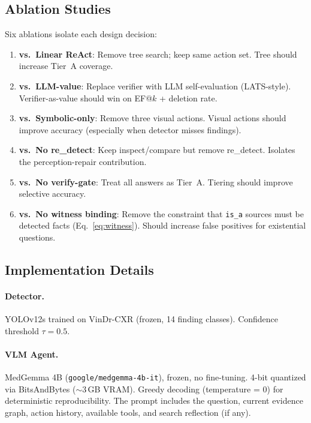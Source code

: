 \documentclass[runningheads]{llncs}
\begin{document}
\subsection{Ablation Studies}

Six ablations isolate each design decision:
\begin{enumerate}
  \item \textbf{vs.\ Linear ReAct}: Remove tree search; keep same action
    set. Tree should increase Tier~A coverage.
  \item \textbf{vs.\ LLM-value}: Replace verifier with LLM self-evaluation
    (LATS-style). Verifier-as-value should win on EF@$k$ + deletion rate.
  \item \textbf{vs.\ Symbolic-only}: Remove three visual actions. Visual
    actions should improve accuracy (especially when detector misses
    findings).
  \item \textbf{vs.\ No re\_detect}: Keep inspect/compare but remove
    re\_detect. Isolates the perception-repair contribution.
  \item \textbf{vs.\ No verify-gate}: Treat all answers as Tier~A.
    Tiering should improve selective accuracy.
  \item \textbf{vs.\ No witness binding}: Remove the constraint that
    \texttt{is\_a} sources must be detected facts (Eq.~\ref{eq:witness}).
    Should increase false positives for existential questions.
\end{enumerate}

\subsection{Implementation Details}

\paragraph{Detector.}
YOLOv12s trained on VinDr-CXR (frozen, 14 finding classes).
Confidence threshold $\tau = 0.5$.

\paragraph{VLM Agent.}
MedGemma 4B (\texttt{google/medgemma-4b-it}), frozen, no fine-tuning.
4-bit quantized via BitsAndBytes ($\sim$3\,GB VRAM).
Greedy decoding (temperature = 0) for deterministic reproducibility.
The prompt includes the question, current evidence graph, action history,
available tools, and search reflection (if any).
\end{document}
